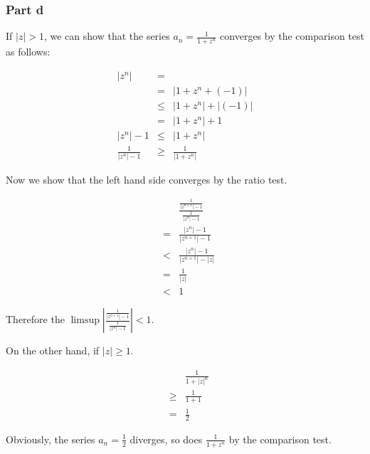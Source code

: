 \subsubsection*{Part d}
If $ |z| > 1 $, we can show that the series $ a_n = \frac{1}{1 + z^n} $ converges by the comparison test as follows:

\begin{eqnarray*}
                |z^n| &=   &  \\
                      &=   & |1 + z^n + (-1)| \\
                      &\le & |1 + z^n| + |(-1)| \\
                      &=   & |1 + z^n| + 1  \\
            |z^n| - 1 &\le & |1 + z^n| \\
  \frac{1}{|z^n| - 1} &\ge & \frac{1}{|1 + z^n|}
\end{eqnarray*}

Now we show that the left hand side converges by the ratio test.

\begin{eqnarray*}
  & & \frac{\frac{1}{|z^{n+1}| - 1}}{\frac{1}{|z^n| - 1}} \\
  &=& \frac{|z^n| - 1}{|z^{n+1}| - 1} \\
  &<& \frac{|z^n| - 1}{|z^{n+1}| - |z|} \\
  &=& \frac{1}{|z|} \\
  &<& 1
\end{eqnarray*}

Therefore the $ \limsup \left| \frac{\frac{1}{|z^{n+1}| - 1}}{\frac{1}{|z^n| - 1}} \right| < 1$.

On the other hand, if $ |z| \ge 1 $.

\begin{eqnarray*}
  &   & \frac{1}{1 + |z|^n} \\
  &\ge& \frac{1}{1 + 1} \\
  &=  & \frac{1}{2}
\end{eqnarray*}

Obviously, the series $ a_n = \frac{1}{2} $ diverges, so does $ \frac{1}{1 + z^n} $ by the comparison test.